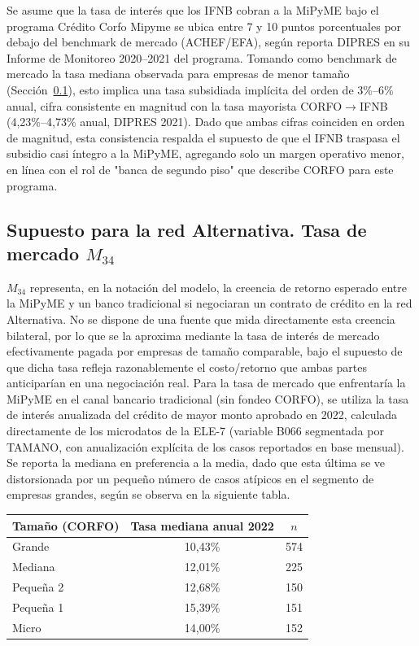 \documentclass[11pt]{article}
\begin{document}
Se asume que la tasa de interés que los IFNB cobran a la MiPyME bajo el programa Crédito Corfo Mipyme se ubica entre 7 y 10 puntos porcentuales por debajo del benchmark de mercado (ACHEF/EFA), según reporta DIPRES en su Informe de Monitoreo 2020--2021 del programa. Tomando como benchmark de mercado la tasa mediana observada para empresas de menor tamaño (Sección~\ref{sec:tasa-mercado}), esto implica una tasa subsidiada implícita del orden de 3\%--6\% anual, cifra consistente en magnitud con la tasa mayorista CORFO$\to$IFNB (4,23\%--4,73\% anual, DIPRES 2021). Dado que ambas cifras coinciden en orden de magnitud, esta consistencia respalda el supuesto de que el IFNB traspasa el subsidio casi íntegro a la MiPyME, agregando solo un margen operativo menor, en línea con el rol de "banca de segundo piso" que describe CORFO para este programa.

\subsection{Supuesto para la red Alternativa. Tasa de mercado $M_{34}$}
\label{sec:tasa-mercado}

$M_{34}$ representa, en la notación del modelo, la creencia de retorno esperado entre la MiPyME y un banco tradicional si negociaran un contrato de crédito en la red Alternativa. No se dispone de una fuente que mida directamente esta creencia bilateral, por lo que se la aproxima mediante la tasa de interés de mercado efectivamente pagada por empresas de tamaño comparable, bajo el supuesto de que dicha tasa refleja razonablemente el costo/retorno que ambas partes anticiparían en una negociación real. Para la tasa de mercado que enfrentaría la MiPyME en el canal bancario tradicional (sin fondeo CORFO), se utiliza la tasa de interés anualizada del crédito de mayor monto aprobado en 2022, calculada directamente de los microdatos de la ELE-7 (variable B066 segmentada por TAMANO, con anualización explícita de los casos reportados en base mensual). Se reporta la mediana en preferencia a la media, dado que esta última se ve distorsionada por un pequeño número de casos atípicos en el segmento de empresas grandes, según se observa en la siguiente tabla.

\begin{center}
\begin{tabular}{lcc}
\hline
Tamaño (CORFO) & Tasa mediana anual 2022 & $n$ \\
\hline
Grande      & 10,43\% & 574 \\
Mediana     & 12,01\% & 225 \\
Pequeña 2   & 12,68\% & 150 \\
Pequeña 1   & 15,39\% & 151 \\
Micro       & 14,00\% & 152 \\
\hline
\end{tabular}
\end{center}
\end{document}
